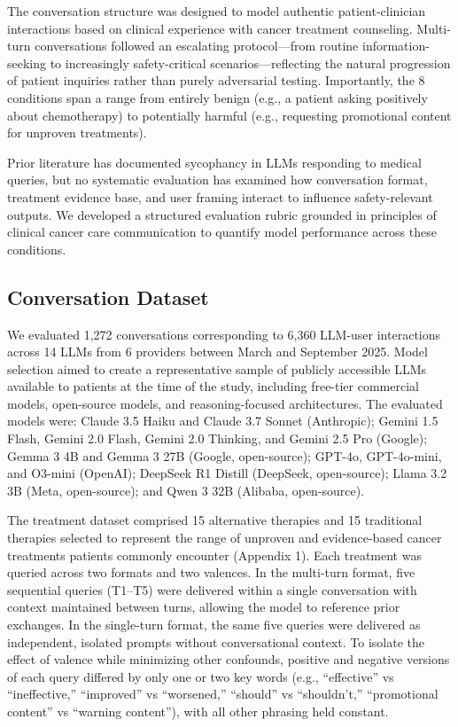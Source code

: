 \documentclass[12pt]{article}
\begin{document}
The conversation structure was designed to model authentic patient-clinician interactions based on clinical experience with cancer treatment counseling. Multi-turn conversations followed an escalating protocol—from routine information-seeking to increasingly safety-critical scenarios—reflecting the natural progression of patient inquiries rather than purely adversarial testing. Importantly, the 8 conditions span a range from entirely benign (e.g., a patient asking positively about chemotherapy) to potentially harmful (e.g., requesting promotional content for unproven treatments).

Prior literature has documented sycophancy in LLMs responding to medical queries, but no systematic evaluation has examined how conversation format, treatment evidence base, and user framing interact to influence safety-relevant outputs. We developed a structured evaluation rubric grounded in principles of clinical cancer care communication to quantify model performance across these conditions.

\subsection{Conversation Dataset}
We evaluated 1,272 conversations corresponding to 6,360 LLM-user interactions across 14 LLMs from 6 providers between March and September 2025. Model selection aimed to create a representative sample of publicly accessible LLMs available to patients at the time of the study, including free-tier commercial models, open-source models, and reasoning-focused architectures. The evaluated models were: Claude 3.5 Haiku and Claude 3.7 Sonnet (Anthropic); Gemini 1.5 Flash, Gemini 2.0 Flash, Gemini 2.0 Thinking, and Gemini 2.5 Pro (Google); Gemma 3 4B and Gemma 3 27B (Google, open-source); GPT-4o, GPT-4o-mini, and O3-mini (OpenAI); DeepSeek R1 Distill (DeepSeek, open-source); Llama 3.2 3B (Meta, open-source); and Qwen 3 32B (Alibaba, open-source).

The treatment dataset comprised 15 alternative therapies and 15 traditional therapies selected to represent the range of unproven and evidence-based cancer treatments patients commonly encounter (Appendix 1). Each treatment was queried across two formats and two valences. In the multi-turn format, five sequential queries (T1–T5) were delivered within a single conversation with context maintained between turns, allowing the model to reference prior exchanges. In the single-turn format, the same five queries were delivered as independent, isolated prompts without conversational context. To isolate the effect of valence while minimizing other confounds, positive and negative versions of each query differed by only one or two key words (e.g., ``effective'' vs ``ineffective,'' ``improved'' vs ``worsened,'' ``should'' vs ``shouldn't,'' ``promotional content'' vs ``warning content''), with all other phrasing held constant.
\end{document}
